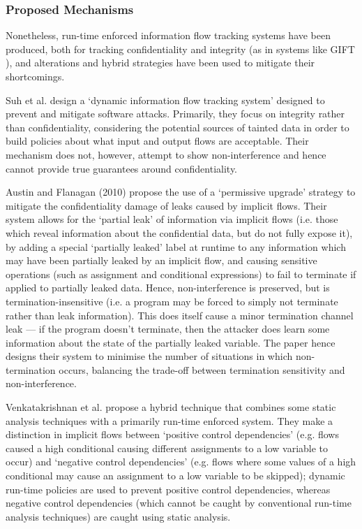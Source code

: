 \subsubsection{Proposed Mechanisms}

Nonetheless, run-time enforced information flow tracking systems have been produced, both for tracking confidentiality and integrity (as in systems like GIFT \cite{lam2006dynamicintegrity}), and alterations and hybrid strategies have been used to mitigate their shortcomings.

Suh et al. \cite{suh2004dynamicintegrity} design a `dynamic information flow tracking system' designed to prevent and mitigate software attacks. Primarily, they focus on integrity rather than confidentiality, considering the potential sources of tainted data in order to build policies about what input and output flows are acceptable. Their mechanism does not, however, attempt to show non-interference and hence cannot provide true guarantees around confidentiality.

Austin and Flanagan (2010) \cite{austin2010runtime} propose the use of a `permissive upgrade' strategy to mitigate the confidentiality damage of leaks caused by implicit flows. Their system allows for the `partial leak' of information via implicit flows (i.e. those which reveal information about the confidential data, but do not fully expose it), by adding a special `partially leaked' label at runtime to any information which may have been partially leaked by an implicit flow, and causing sensitive operations (such as assignment and conditional expressions) to fail to terminate if applied to partially leaked data. Hence, non-interference is preserved, but is termination-insensitive (i.e. a program may be forced to simply not terminate rather than leak information). This does itself cause a minor termination channel leak --- if the program doesn't terminate, then the attacker does learn some information about the state of the partially leaked variable. The paper hence designs their system to minimise the number of situations in which non-termination occurs, balancing the trade-off between termination sensitivity and non-interference.

Venkatakrishnan et al. \cite{venkatakrishnan2006runtime} propose a hybrid technique that combines some static analysis techniques with a primarily run-time enforced system. They make a distinction in implicit flows between `positive control dependencies' (e.g. flows caused a high conditional causing different assignments to a low variable to occur) and `negative control dependencies' (e.g. flows where some values of a high conditional may cause an assignment to a low variable to be skipped); dynamic run-time policies are used to prevent positive control dependencies, whereas negative control dependencies (which cannot be caught by conventional run-time analysis techniques) are caught using static analysis.

